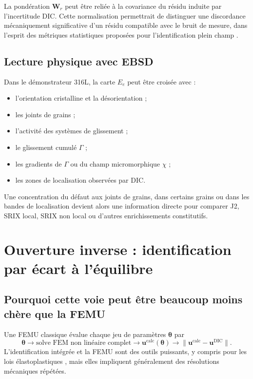 \documentclass[11pt,a4paper]{article}
\newcommand{\udic}{\bm{u}^{\mathrm{DIC}}}
\begin{document}
La pondération $\bm{W}_r$ peut être reliée à la covariance du résidu induite par l'incertitude DIC.
Cette normalisation permettrait de distinguer une discordance mécaniquement significative d'un
résidu compatible avec le bruit de mesure, dans l'esprit des métriques statistiques proposées pour
l'identification plein champ \parencite{roux2020optimal}.

\subsection{Lecture physique avec EBSD}

Dans le démonstrateur 316L, la carte $E_e$ peut être croisée avec :
\begin{itemize}
  \item l'orientation cristalline et la désorientation ;
  \item les joints de grains ;
  \item l'activité des systèmes de glissement ;
  \item le glissement cumulé $\Gamma$ ;
  \item les gradients de $\Gamma$ ou du champ micromorphique $\chi$ ;
  \item les zones de localisation observées par DIC.
\end{itemize}
Une concentration du défaut aux joints de grains, dans certains grains ou dans les bandes de
localisation devient alors une information directe pour comparer J2, SRIX local, SRIX non local ou
d'autres enrichissements constitutifs.

\section{Ouverture inverse : identification par écart à l'équilibre}

\subsection{Pourquoi cette voie peut être beaucoup moins chère que la FEMU}

Une FEMU classique évalue chaque jeu de paramètres $\bm{\theta}$ par
\begin{equation}
 \bm{\theta}
 \longrightarrow
 \text{solve FEM non linéaire complet}
 \longrightarrow
 \bm{u}^{\mathrm{calc}}(\bm{\theta})
 \longrightarrow
 \|\bm{u}^{\mathrm{calc}}-\udic\|.
\end{equation}
L'identification intégrée et la FEMU sont des outils puissants, y compris pour les lois
élastoplastiques \parencite{bertin2016idic}, mais elles impliquent généralement des résolutions
mécaniques répétées.
\end{document}
